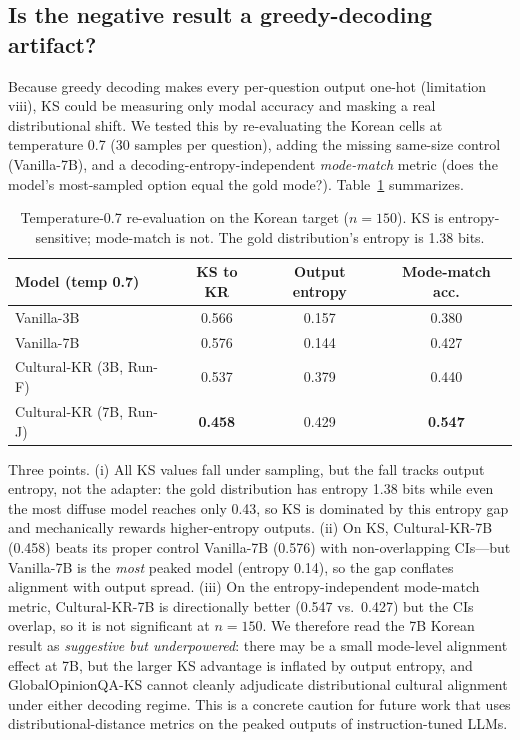 \documentclass{article}
\begin{document}
\subsection{Is the negative result a greedy-decoding artifact?}
\label{sec:tempanalysis}
Because greedy decoding makes every per-question output one-hot (limitation viii), KS could be measuring only modal accuracy and masking a real distributional shift. We tested this by re-evaluating the Korean cells at temperature 0.7 (30 samples per question), adding the missing same-size control (Vanilla-7B), and a decoding-entropy-independent \emph{mode-match} metric (does the model's most-sampled option equal the gold mode?). Table~\ref{tab:temp} summarizes.

\begin{table}[t]
\centering
\small
\caption{Temperature-0.7 re-evaluation on the Korean target ($n=150$). KS is entropy-sensitive; mode-match is not. The gold distribution's entropy is 1.38 bits.}
\label{tab:temp}
\begin{tabular}{lccc}
\toprule
Model (temp 0.7) & KS to KR & Output entropy & Mode-match acc. \\
\midrule
Vanilla-3B & 0.566 & 0.157 & 0.380 \\
Vanilla-7B & 0.576 & 0.144 & 0.427 \\
Cultural-KR (3B, Run-F) & 0.537 & 0.379 & 0.440 \\
Cultural-KR (7B, Run-J) & \textbf{0.458} & 0.429 & \textbf{0.547} \\
\bottomrule
\end{tabular}
\end{table}

Three points. (i) All KS values fall under sampling, but the fall tracks output entropy, not the adapter: the gold distribution has entropy 1.38 bits while even the most diffuse model reaches only 0.43, so KS is dominated by this entropy gap and mechanically rewards higher-entropy outputs. (ii) On KS, Cultural-KR-7B (0.458) beats its proper control Vanilla-7B (0.576) with non-overlapping CIs---but Vanilla-7B is the \emph{most} peaked model (entropy 0.14), so the gap conflates alignment with output spread. (iii) On the entropy-independent mode-match metric, Cultural-KR-7B is directionally better (0.547 vs.\ 0.427) but the CIs overlap, so it is not significant at $n=150$. We therefore read the 7B Korean result as \emph{suggestive but underpowered}: there may be a small mode-level alignment effect at 7B, but the larger KS advantage is inflated by output entropy, and GlobalOpinionQA-KS cannot cleanly adjudicate distributional cultural alignment under either decoding regime. This is a concrete caution for future work that uses distributional-distance metrics on the peaked outputs of instruction-tuned LLMs.
\end{document}
